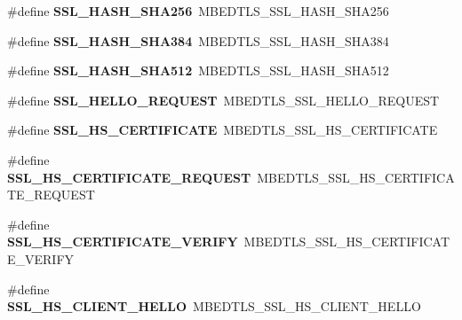 \begin{DoxyCompactItemize}
\mbox{\label{compat-1_83_8h_ab51d97eb425ea28e542c0679213fe40f}} 
\#define {\bfseries S\+S\+L\+\_\+\+H\+A\+S\+H\+\_\+\+S\+H\+A256}~M\+B\+E\+D\+T\+L\+S\+\_\+\+S\+S\+L\+\_\+\+H\+A\+S\+H\+\_\+\+S\+H\+A256
\item 
\mbox{\label{compat-1_83_8h_a2569b6e7eaa2aec958c98f22673109e5}} 
\#define {\bfseries S\+S\+L\+\_\+\+H\+A\+S\+H\+\_\+\+S\+H\+A384}~M\+B\+E\+D\+T\+L\+S\+\_\+\+S\+S\+L\+\_\+\+H\+A\+S\+H\+\_\+\+S\+H\+A384
\item 
\mbox{\label{compat-1_83_8h_a5beeed84ccae1b316a473bedec444837}} 
\#define {\bfseries S\+S\+L\+\_\+\+H\+A\+S\+H\+\_\+\+S\+H\+A512}~M\+B\+E\+D\+T\+L\+S\+\_\+\+S\+S\+L\+\_\+\+H\+A\+S\+H\+\_\+\+S\+H\+A512
\item 
\mbox{\label{compat-1_83_8h_a52d6af739b93dcdc9a87674b2036845a}} 
\#define {\bfseries S\+S\+L\+\_\+\+H\+E\+L\+L\+O\+\_\+\+R\+E\+Q\+U\+E\+ST}~M\+B\+E\+D\+T\+L\+S\+\_\+\+S\+S\+L\+\_\+\+H\+E\+L\+L\+O\+\_\+\+R\+E\+Q\+U\+E\+ST
\item 
\mbox{\label{compat-1_83_8h_aaaaa25b3ce92c5da9f357928032c3614}} 
\#define {\bfseries S\+S\+L\+\_\+\+H\+S\+\_\+\+C\+E\+R\+T\+I\+F\+I\+C\+A\+TE}~M\+B\+E\+D\+T\+L\+S\+\_\+\+S\+S\+L\+\_\+\+H\+S\+\_\+\+C\+E\+R\+T\+I\+F\+I\+C\+A\+TE
\item 
\mbox{\label{compat-1_83_8h_a146ced9f8b0ae516cc78f1cec065b4a2}} 
\#define {\bfseries S\+S\+L\+\_\+\+H\+S\+\_\+\+C\+E\+R\+T\+I\+F\+I\+C\+A\+T\+E\+\_\+\+R\+E\+Q\+U\+E\+ST}~M\+B\+E\+D\+T\+L\+S\+\_\+\+S\+S\+L\+\_\+\+H\+S\+\_\+\+C\+E\+R\+T\+I\+F\+I\+C\+A\+T\+E\+\_\+\+R\+E\+Q\+U\+E\+ST
\item 
\mbox{\label{compat-1_83_8h_a373b6769a2f5555bc03d16f25fd43286}} 
\#define {\bfseries S\+S\+L\+\_\+\+H\+S\+\_\+\+C\+E\+R\+T\+I\+F\+I\+C\+A\+T\+E\+\_\+\+V\+E\+R\+I\+FY}~M\+B\+E\+D\+T\+L\+S\+\_\+\+S\+S\+L\+\_\+\+H\+S\+\_\+\+C\+E\+R\+T\+I\+F\+I\+C\+A\+T\+E\+\_\+\+V\+E\+R\+I\+FY
\item 
\mbox{\label{compat-1_83_8h_a565597ab4583db29a05d49c7fa0686a2}} 
\#define {\bfseries S\+S\+L\+\_\+\+H\+S\+\_\+\+C\+L\+I\+E\+N\+T\+\_\+\+H\+E\+L\+LO}~M\+B\+E\+D\+T\+L\+S\+\_\+\+S\+S\+L\+\_\+\+H\+S\+\_\+\+C\+L\+I\+E\+N\+T\+\_\+\+H\+E\+L\+LO

\end{DoxyCompactItemize}
